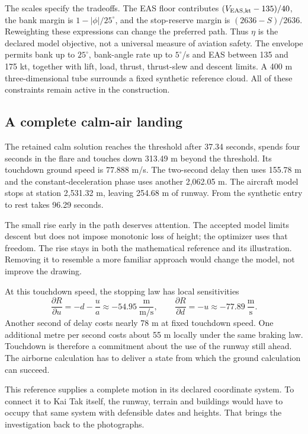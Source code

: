 The scales specify the tradeoffs. The EAS floor contributes $(V_{\rm EAS,kt}-135)/40$, the bank margin is $1-|\phi|/25^\circ$, and the stop-reserve margin is $(2636-S)/2636$. Reweighting these expressions can change the preferred path. Thus $\eta$ is the declared model objective, not a universal measure of aviation safety. The envelope permits bank up to $25^\circ$, bank-angle rate up to $5^\circ$/s and EAS between 135 and 175 kt, together with lift, load, thrust, thrust-slew and descent limits. A 400 m three-dimensional tube surrounds a fixed synthetic reference cloud. All of these constraints remain active in the construction.

\subsection*{A complete calm-air landing}
The retained calm solution reaches the threshold after 37.34 seconds, spends four seconds in the flare and touches down 313.49 m beyond the threshold. Its touchdown ground speed is 77.888 m/s. The two-second delay then uses 155.78 m and the constant-deceleration phase uses another 2,062.05 m. The aircraft model stops at station 2,531.32 m, leaving 254.68 m of runway. From the synthetic entry to rest takes 96.29 seconds.


The small rise early in the path deserves attention. The accepted model limits descent but does not impose monotonic loss of height; the optimizer uses that freedom. The rise stays in both the mathematical reference and its illustration. Removing it to resemble a more familiar approach would change the model, not improve the drawing.

At this touchdown speed, the stopping law has local sensitivities
\begin{equation}
\frac{\partial R}{\partial u}=-d-\frac{u}{a}\approx-54.95\ \frac{\mathrm m}{\mathrm{m/s}},
\qquad \frac{\partial R}{\partial d}=-u\approx-77.89\ \frac{\mathrm m}{\mathrm s}.
\end{equation}
Another second of delay costs nearly 78 m at fixed touchdown speed. One additional metre per second costs about 55 m locally under the same braking law. Touchdown is therefore a commitment about the use of the runway still ahead. The airborne calculation has to deliver a state from which the ground calculation can succeed.

This reference supplies a complete motion in its declared coordinate system. To connect it to Kai Tak itself, the runway, terrain and buildings would have to occupy that same system with defensible dates and heights. That brings the investigation back to the photographs.
